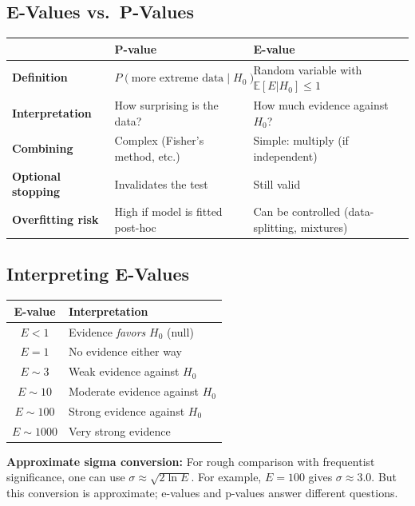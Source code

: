 \documentclass[11pt,a4paper]{article}
\newcommand{\E}{\mathbb{E}}
\begin{document}
\subsection{E-Values vs.\ P-Values}

\begin{center}
\begin{tabular}{p{3.5cm}p{4.5cm}p{4.5cm}}
\toprule
& \textbf{P-value} & \textbf{E-value} \\
\midrule
\textbf{Definition} & $P(\text{more extreme data} \mid H_0)$ & Random variable with $\E[E|H_0] \leq 1$ \\
\textbf{Interpretation} & How surprising is the data? & How much evidence against $H_0$? \\
\textbf{Combining} & Complex (Fisher's method, etc.) & Simple: multiply (if independent) \\
\textbf{Optional stopping} & Invalidates the test & Still valid \\
\textbf{Overfitting risk} & High if model is fitted post-hoc & Can be controlled (data-splitting, mixtures) \\
\bottomrule
\end{tabular}
\end{center}

\subsection{Interpreting E-Values}

\begin{center}
\begin{tabular}{cl}
\toprule
\textbf{E-value} & \textbf{Interpretation} \\
\midrule
$E < 1$ & Evidence \textit{favors} $H_0$ (null) \\
$E = 1$ & No evidence either way \\
$E \sim 3$ & Weak evidence against $H_0$ \\
$E \sim 10$ & Moderate evidence against $H_0$ \\
$E \sim 100$ & Strong evidence against $H_0$ \\
$E \sim 1000$ & Very strong evidence \\
\bottomrule
\end{tabular}
\end{center}

\textbf{Approximate sigma conversion:} For rough comparison with frequentist significance, one can use $\sigma \approx \sqrt{2 \ln E}$. For example, $E = 100$ gives $\sigma \approx 3.0$. But this conversion is approximate; e-values and p-values answer different questions.
\end{document}
